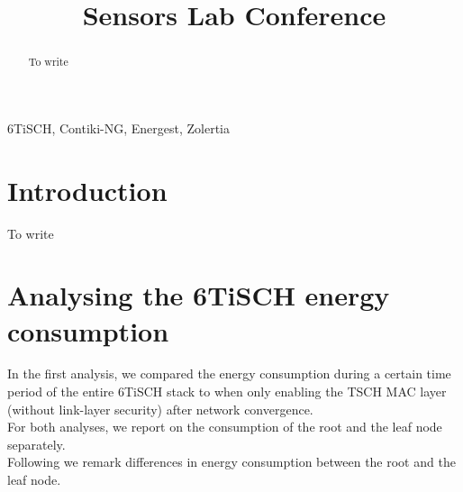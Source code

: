 \documentclass[conference]{IEEEtran}
\begin{document}
\title{Sensors Lab Conference}

\author{
\and
{}
\and
{}
}

\maketitle

\begin{abstract}
To write
\end{abstract}

\begin{IEEEkeywords}
6TiSCH, Contiki-NG, Energest, Zolertia
\end{IEEEkeywords}

\section{Introduction}
To write

\section{Analysing the 6TiSCH energy consumption}
\label{section:task1}
In the first analysis, we compared the energy consumption during a certain time period of the entire 6TiSCH stack to when only enabling the TSCH MAC layer (without link-layer security) after network convergence.\\
For both analyses, we report on the consumption of the root and the leaf node separately.\\
Following we remark differences in energy consumption between the root and the leaf node.
\end{document}
